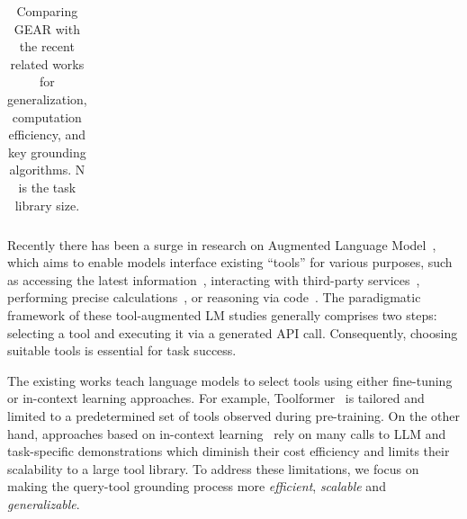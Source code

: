 \documentclass[11pt]{article}
\newcommand{\daniel}[1]{{\color{purple}[DK: #1]}}
\newcommand{\yining}[1]{{\color{ForestGreen}[YL: #1]}}
\newcommand{\llm}{\textcolor{darkredTwo}{LLM}}
\newcommand{\name}{{\fontfamily{cmss}\selectfont GEAR}}
\begin{document}
\begin{table}[t]
{\begin{tabular}{@{}lcccccc@{}}
\\ \bottomrule
\end{tabular}
}
\caption{Comparing \name{} with the recent related works for generalization, computation efficiency, and key grounding algorithms. N is the task library size. 
    }
\label{table:compare}
\end{table}

Recently there has been a surge in research on Augmented Language Model~\citep{mialon2023augmented}, which aims to enable models interface existing ``tools'' for various purposes, such as accessing the latest information~\citep{izacard2022few}, interacting with third-party services~\citep{liang2023taskmatrix}, performing precise calculations~\citep{schick2023toolformer}, or reasoning via code~\citep{cheng2022binding, gao2022pal}. The paradigmatic framework of these tool-augmented LM studies generally comprises two steps: selecting a tool and executing it via a generated API call. Consequently, choosing suitable tools is essential for task success.

The existing works teach language models to select tools using either fine-tuning or in-context learning approaches. For example, Toolformer~\citep{schick2023toolformer} is tailored and limited to a predetermined set of tools observed during pre-training. On the other hand, approaches based on in-context learning~\citep{li2023api, paranjape2023art, chen2023chatcot, sun2023adaplanner, yao2022react} rely on many calls to \llm{} and task-specific demonstrations which diminish their cost efficiency and limits their scalability to a large tool library. 
To address these limitations, we focus on making the query-tool grounding process more \emph{efficient}, \emph{scalable} and \emph{generalizable}.
\end{document}
